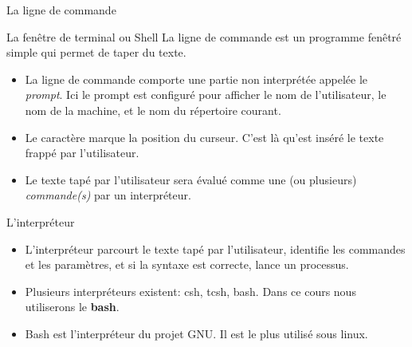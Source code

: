 \begin{frame}{La ligne de commande}
  \begin{center}
    \mprompt{ \prompt{\cursor}{} }
  \end{center}
  \begin{block}{La fenêtre de terminal ou Shell}
    La ligne de commande est un programme fenêtré simple qui permet de
    taper du texte.
    \begin{itemize}
    \item La ligne de commande comporte une partie non interprétée
       appelée le
      \textit{prompt}. Ici le prompt est configuré pour afficher le
      {\color{red}nom de l'utilisateur}, le {\color{solarizedGreen}nom
        de la machine}, et le {\color{solarizedBlue}nom du répertoire
        courant}.
    \item Le caractère \lin{\cursor} marque la position du
      curseur. C'est là qu'est inséré le texte frappé par l'utilisateur.
    \item Le texte tapé par l'utilisateur sera évalué comme une (ou
      plusieurs) \emph{commande(s)} par un interpréteur.
    \end{itemize}
  \end{block}
  \begin{block}{L'interpréteur}
    \begin{itemize}
    \item L'interpréteur parcourt le texte tapé par l'utilisateur,
      identifie les commandes et les paramètres, et si la syntaxe est
      correcte, lance un processus.
    \item Plusieurs interpréteurs existent: csh, tcsh, bash. Dans ce
      cours nous utiliserons le \textbf{bash}.
    \item Bash est l'interpréteur du projet GNU. Il est le plus utilisé
      sous linux.
    \end{itemize}
  \end{block}
\end{frame}
